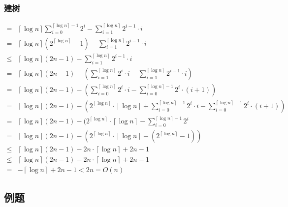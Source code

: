 \documentclass[utf8]{ctexbeamer}
\begin{document}
    \begin{frame}
        \frametitle{建树}
        \tiny
        \begin{align}
              =&\left\lceil\log n\right\rceil\sum_{i=0}^{\left\lceil\log n\right\rceil-1}2^i-\sum_{i=1}^{\left\lceil\log n\right\rceil}2^{i-1}\cdot i\nonumber\\
              =&\left\lceil\log n\right\rceil(2^{\left\lceil\log n\right\rceil}-1)-\sum_{i=1}^{\left\lceil\log n\right\rceil}2^{i-1}\cdot i\nonumber\\
            \le&\left\lceil\log n\right\rceil(2n-1)-\sum_{i=1}^{\left\lceil\log n\right\rceil}2^{i-1}\cdot i\nonumber\\
              =&\left\lceil\log n\right\rceil(2n-1)-(\sum_{i=1}^{\left\lceil\log n\right\rceil}2^{i}\cdot i-\sum_{i=1}^{\left\lceil\log n\right\rceil}2^{i-1}\cdot i)\nonumber\\
              =&\left\lceil\log n\right\rceil(2n-1)-(\sum_{i=0}^{\left\lceil\log n\right\rceil}2^{i}\cdot i-\sum_{i=0}^{\left\lceil\log n\right\rceil-1}2^i\cdot (i+1))\nonumber\\
              =&\left\lceil\log n\right\rceil(2n-1)-(2^{\left\lceil\log n\right\rceil}\cdot \left\lceil\log n\right\rceil+\sum_{i=0}^{\left\lceil\log n\right\rceil-1}2^{i}\cdot i-\sum_{i=0}^{\left\lceil\log n\right\rceil-1}2^i\cdot (i+1))\nonumber\\
              =&\left\lceil\log n\right\rceil(2n-1)-(2^{\left\lceil\log n\right\rceil}\cdot \left\lceil\log n\right\rceil-\sum_{i=0}^{\left\lceil\log n\right\rceil-1}2^{i}\nonumber\\
              =&\left\lceil\log n\right\rceil(2n-1)-(2^{\left\lceil\log n\right\rceil}\cdot \left\lceil\log n\right\rceil-(2^{\left\lceil\log n\right\rceil}-1))\nonumber\\
            \le&\left\lceil\log n\right\rceil(2n-1)-2n\cdot \left\lceil\log n\right\rceil+2n-1\nonumber\\
            \le&\left\lceil\log n\right\rceil(2n-1)-2n\cdot \left\lceil\log n\right\rceil+2n-1\nonumber\\
              =&-\left\lceil\log n\right\rceil+2n-1<2n=O(n)\nonumber
        \end{align}
    \end{frame}

    \subsection{例题}
    
\end{document}
